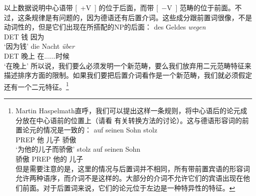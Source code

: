 \zl
以上数据说明中心语带 [~+V~] 的位于后面，而带 [~$-$V~] 范畴的位于前面。不过，这条规律是有问题的，因为德语还有后置介词。这些成分跟前置词很像，不是动词性的，但是它们出现在所搭配的NP的后面：
\eal
\ex 
\gll des Geldes \emph{wegen}\\
     DET 钱 因为\\
\glt `因为钱'
\ex 
\gll die Nacht \emph{über}\\
     DET 晚上 在......时候\\
\glt `在晚上'
\zl
所以说，我们要么必须发明一个新范畴，要么我们放弃用二元范畴特征来描述排序方面的限制。如果我们要把后置介词看作是一个新范畴，我们就必须假定还有一个二元特征。\footnote{
Martin Haspelmath直呼，我们可以提出这样一条规则，将中心语后的论元成分放在中心语前的位置上（请看\citealp[]{Riemsdijk78a} 有关转换方法的讨论）。这与德语形容词的前置论元的情况是一致的：
\eal
\ex
\gll auf seinen Sohn stolz\\
     PREP  他 儿子 骄傲\\
\glt `为他的儿子而骄傲'
\ex 
\gll stolz auf seinen Sohn\\
     骄傲 PREP 他的 儿子\\
\zl
但是需要注意的是，这里的情况与后置词并不相同，所有带前置宾语的形容词允许两种语序，而介词不是这样的。大部分的介词不允许它们的宾语出现在他们前面。对于后置词来说，它们的论元位于左边是一种特异性的特征。
} 
